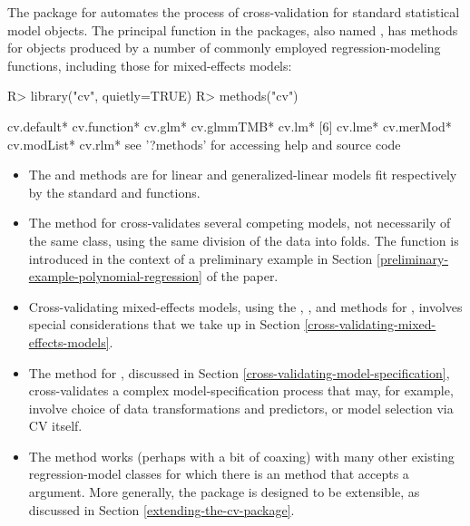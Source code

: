 \documentclass[
]{jss}
\begin{document}
The  package for  automates the process of
cross-validation for standard  statistical model objects.
The principal function in the packages, also named , has
methods for objects produced by a number of commonly employed
regression-modeling functions, including those for mixed-effects models:

\begin{CodeChunk}
\begin{CodeInput}
R> library("cv", quietly=TRUE)
R> methods("cv")
\end{CodeInput}
\begin{CodeOutput}
[1] cv.default*  cv.function* cv.glm*      cv.glmmTMB*  cv.lm*      
[6] cv.lme*      cv.merMod*   cv.modList*  cv.rlm*     
see '?methods' for accessing help and source code
\end{CodeOutput}
\end{CodeChunk}

\begin{itemize}
\item
  The  and  methods are for linear and
  generalized-linear models fit respectively by the standard
    and  functions.
\item
  The  method for  cross-validates several
  competing models, not necessarily of the same class, using the same
  division of the data into folds. The  function is
  introduced in the context of a preliminary example in Section
  \ref{preliminary-example-polynomial-regression} of the paper.
\item
  Cross-validating mixed-effects models, using the ,
  , and  methods for , involves
  special considerations that we take up in Section
  \ref{cross-validating-mixed-effects-models}.
\item
  The  method for , discussed in Section
  \ref{cross-validating-model-specification}, cross-validates a complex
  model-specification process that may, for example, involve choice of
  data transformations and predictors, or model selection via CV itself.
\item
  The   method works (perhaps with a bit of
  coaxing) with many other existing regression-model classes for which
  there is an  method that accepts a 
  argument. More generally, the  package is designed to be
  extensible, as discussed in Section \ref{extending-the-cv-package}.
\end{itemize}
\end{document}
